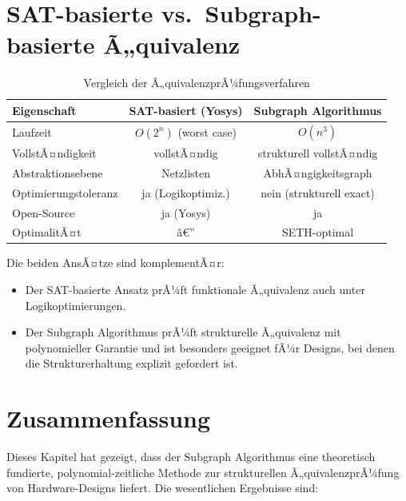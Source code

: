 ﻿\documentclass[12pt,a4paper]{report}
\begin{document}
\section{SAT-basierte vs.\ Subgraph-basierte Ã„quivalenz}
\label{subsec:vergleich}

\begin{table}[H]
\centering
\begin{tabular}{|l|c|c|}
\hline
\textbf{Eigenschaft} & \textbf{SAT-basiert (Yosys)} & \textbf{Subgraph Algorithmus} \\
\hline
Laufzeit & $O(2^n)$ (worst case) & $O(n^3)$ \\
VollstÃ¤ndigkeit & vollstÃ¤ndig & strukturell vollstÃ¤ndig \\
Abstraktionsebene & Netzlisten & AbhÃ¤ngigkeitsgraph \\
Optimierungstoleranz & ja (Logikoptimiz.) & nein (strukturell exact) \\
Open-Source & ja (Yosys) & ja \\
OptimalitÃ¤t & â€” & SETH-optimal \\
\hline
\end{tabular}
\caption{Vergleich der Ã„quivalenzprÃ¼fungsverfahren}
\end{table}

Die beiden AnsÃ¤tze sind komplementÃ¤r:
\begin{itemize}
    \item Der SAT-basierte Ansatz prÃ¼ft funktionale Ã„quivalenz auch unter Logikoptimierungen.
    \item Der Subgraph Algorithmus prÃ¼ft strukturelle Ã„quivalenz mit polynomieller Garantie und ist besonders geeignet fÃ¼r Designs, bei denen die Strukturerhaltung explizit gefordert ist.
\end{itemize}

\section{Zusammenfassung}

Dieses Kapitel hat gezeigt, dass der Subgraph Algorithmus \cite{subgraph2026} eine theoretisch fundierte, polynomial-zeitliche Methode zur strukturellen Ã„quivalenzprÃ¼fung von Hardware-Designs liefert. Die wesentlichen Ergebnisse sind:
\end{document}
